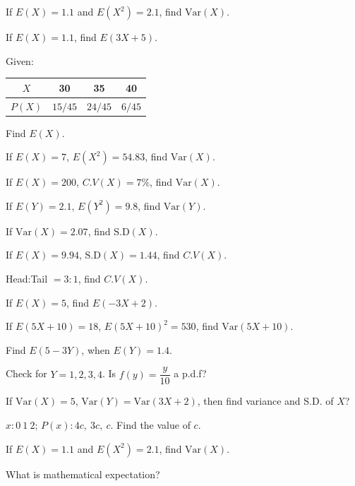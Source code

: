 \documentclass[11pt,a4paper]{article}
\begin{document}
\begin{shortlist}
\item If $E(X)=1.1$ and $E(X^2)=2.1$, find $\mathrm{Var}(X)$.

\item If $E(X)=1.1$, find $E(3X+5)$.

\item Given: 
\begin{center}
\begin{tabular}{c|ccc}
$X$ & 30 & 35 & 40 \\
\hline
$P(X)$ & $15/45$ & $24/45$ & $6/45$
\end{tabular}
\end{center}
Find $E(X)$.

\item If $E(X)=7$, $E(X^2)=54.83$, find $\mathrm{Var}(X)$.

\item If $E(X)=200$, $C.V(X)=7\%$, find $\mathrm{Var}(X)$.

\item If $E(Y)=2.1$, $E(Y^2)=9.8$, find $\mathrm{Var}(Y)$.

\item If $\mathrm{Var}(X)=2.07$, find $\mathrm{S.D}(X)$.

\item If $E(X)=9.94$, $\mathrm{S.D}(X)=1.44$, find $C.V(X)$.

\item Head:Tail $=3:1$, find $C.V(X)$.

\item If $E(X)=5$, find $E(-3X+2)$.

\item If $E(5X+10)=18$, $E(5X+10)^2=530$, find $\mathrm{Var}(5X+10)$.

\item Find $E(5-3Y)$, when $E(Y)=1.4$.

\item Check for $Y=1,2,3,4$. Is $f(y)=\dfrac{y}{10}$ a p.d.f?

\item If $\mathrm{Var}(X)=5$, $\mathrm{Var}(Y)=\mathrm{Var}(3X+2)$, then find variance and S.D. of $X$?

\item $x: 0\ 1\ 2$; $P(x): 4c,\ 3c,\ c$. Find the value of $c$.

\item If $E(X)=1.1$ and $E(X^2)=2.1$, find $\mathrm{Var}(X)$.

\item What is mathematical expectation?


\end{shortlist}
\end{document}
